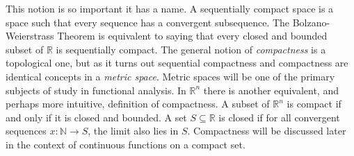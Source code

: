 \documentclass[crop=false,class=book,oneside]{standalone}
\begin{document}
            This notion is so important it has a name.
            A sequentially compact space is a space such that
            every sequence has a convergent subsequence. The
            Bolzano-Weierstrass Theorem is equivalent
            to saying that every closed and bounded subset
            of $\mathbb{R}$ is sequentially
            compact. The general notion of \textit{compactness}
            is a topological one, but as it turns out
            sequential compactness and compactness are
            identical concepts in a \textit{metric space}.
            Metric spaces will be one of the primary
            subjects of study in functional analysis.
            In $\mathbb{R}^{n}$ there is another equivalent,
            and perhaps more intuitive,
            definition of compactness. A subset of
            $\mathbb{R}^{n}$ is compact if and only if it
            is closed and bounded. A set
            $S\subseteq\mathbb{R}$ is closed if for
            all convergent sequences
            $x:\mathbb{N}\rightarrow{S}$,
            the limit also lies in $S$.
            Compactness will be discussed later in the
            context of continuous functions on a compact set.
\end{document}
